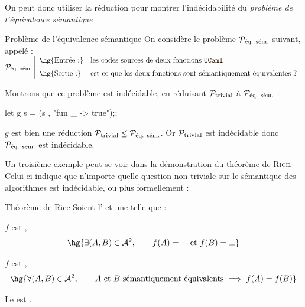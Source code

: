 \documentclass[a4paper,french,bookmarks]{book}
\newcommand{\langOcaml}{\texttt{\color{ocamlColor!20!black}OCaml}}
\begin{document}
    On peut donc utiliser la réduction pour montrer l'indécidabilité du \emph{problème de l'équivalence sémantique} 
    \begin{example}{Problème de l'équivalence sémantique}{}
        On considère le problème $\mathcal{P}_\text{éq. sém.}$ suivant, appelé  :
        \( \bcP_\text{éq. sém.} \left\vert\begin{array}{ll}
                \text{\hg{Entrée :}} & \text{les codes sources de deux fonctions \langOcaml{}}  \\[0.2cm]
                \text{\hg{Sortie :}} & \text{est-ce que les deux fonctions sont sémantiquement équivalentes ?}
            \end{array}\right.\)
    
        Montrons que ce problème est indécidable, en réduisant $\mathcal{P}_\text{trivial}$ à $\mathcal{P}_\text{éq. sém.}$ :
        \begin{ocaml}
let g s = (s , "fun _ -> true");;
        \end{ocaml}
        $g$ est bien une réduction $\mathcal{P}_\text{trivial} \leq \mathcal{P}_\text{éq. sém.}$. Or $\mathcal{P}_\text{trivial}$ est indécidable donc $\mathcal{P}_\text{éq. sém.}$ est indécidable.
    \end{example}
    
    Un troisième exemple peut se voir dans la démonstration du théorème de \textsc{Rice}. Celui-ci indique que n'importe quelle question non triviale sur le sémantique des algorithmes est indécidable, ou plus formellement :  
    
    \begin{theorem}{Théorème de Rice}{}
        Soient l' et une  telle que :
        \begin{enumerate}
            \itast $f$ est , \ie 
            \[ \hg{\exists \p{A, B} \in \bcA^2,\qquad f\p{A} = \top \et f\p{B} = \bot} \] 
            
            \itast $f$ est , \ie 
            \[ \hg{\forall \p{A, B} \in \bcA^2,\qquad A \et B \ \text{sémantiquement équivalents} \implies f\p{A} = f\p{B}}\]
        \end{enumerate}
        Le  est .
    \end{theorem}
    
\end{document}
